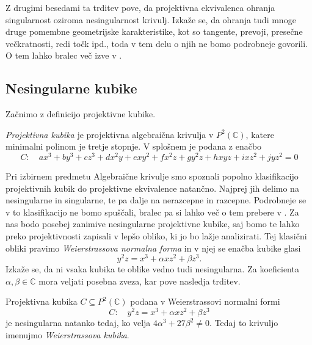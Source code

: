 \documentclass[mat1]{fmfdelo}
\newcommand{\C}{\mathbb C}
\newcommand{\PC}{P^2(\mathbb C)}
\theoremstyle{definition}
\begin{document}
Z drugimi besedami ta trditev pove, da projektivna ekvivalenca ohranja singularnost oziroma nesingularnost krivulj. Izkaže se, da ohranja tudi mnoge druge pomembne geometrijske karakteristike, kot so tangente, prevoji, presečne večkratnosti, redi točk ipd., toda v tem delu o njih ne bomo podrobneje govorili. O tem lahko bralec več izve v \cite{Gibson}.



\subsection{Nesingularne kubike}\label{nesingularne kubike}
Začnimo z definicijo projektivne kubike. 

\begin{definicija}
    \emph{Projektivna kubika} je projektivna algebraična krivulja v $\PC$, katere minimalni polinom je tretje stopnje. 
    V splošnem je podana z enačbo
    \[
        C: \quad ax^3 + by^3 + cz^3 + dx^2y + exy^2 + fx^2z + gy^2z + hxyz + ixz^2 + jyz^2 = 0
    \]
\end{definicija}

Pri izbirnem predmetu Algebraične krivulje smo spoznali popolno klasifikacijo projektivnih kubik do projektivne ekvivalence natančno. Najprej jih delimo na nesingularne in singularne, te pa dalje na nerazcepne in razcepne. Podrobneje se v to klasifikacijo ne bomo spuščali, bralec pa si lahko več o tem prebere v \cite[poglavje 15]{Gibson}.
Za nas bodo posebej zanimive nesingularne projektivne kubike, saj bomo te lahko preko projektivnosti zapisali v lepšo obliko, ki jo bo lažje analizirati. Tej klasični obliki pravimo \emph{Weierstrassova normalna forma} in v njej se enačba kubike glasi 
\begin{equation}
    \label{klasicna wnf}
    y^2z = x^3 + \alpha xz^2 + \beta z^3. 
\end{equation}
Izkaže se, da ni vsaka kubika te oblike vedno tudi nesingularna. Za koeficienta $\alpha, \beta \in \C$ mora veljati posebna zveza, kar pove nasledja trditev.

\begin{trditev}
    Projektivna kubika $C \subseteq \PC$ podana v Weierstrassovi normalni formi
    \[
        C: \quad y^2z = x^3 + \alpha xz^2 + \beta z^3
    \]
    je nesingularna natanko tedaj, ko velja $4\alpha^3 + 27\beta^2 \neq 0$. Tedaj to krivuljo imenujmo \emph{Weierstrassova kubika}. 

\end{trditev}
\end{document}
